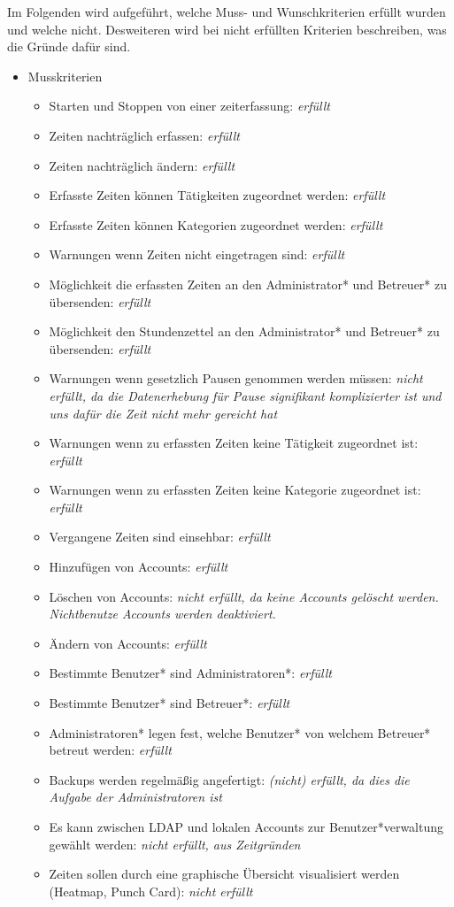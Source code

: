 Im Folgenden wird aufgeführt, welche Muss- und Wunschkriterien erfüllt wurden und welche nicht. Desweiteren wird bei nicht erfüllten Kriterien beschreiben, was die Gründe dafür sind.

\begin{itemize}
  \item Musskriterien
    \begin{itemize}
      \item Starten und Stoppen von einer zeiterfassung: \emph{erfüllt}
      \item Zeiten nachträglich erfassen: \emph{erfüllt} 
      \item Zeiten nachträglich ändern: \emph{erfüllt}
      \item Erfasste Zeiten können Tätigkeiten zugeordnet werden: \emph{erfüllt}
      \item Erfasste Zeiten können Kategorien zugeordnet werden: \emph{erfüllt}
      \item Warnungen wenn Zeiten nicht eingetragen sind: \emph{erfüllt}
      \item Möglichkeit die erfassten Zeiten an den Administrator* und Betreuer* zu übersenden: \emph{erfüllt}
	    \item Möglichkeit den Stundenzettel an den Administrator* und Betreuer* zu übersenden: \emph{erfüllt}
	    \item Warnungen wenn gesetzlich Pausen genommen werden müssen: \emph{nicht erfüllt, da die Datenerhebung für Pause signifikant komplizierter ist und uns dafür die Zeit nicht mehr gereicht hat}
	    \item Warnungen wenn zu erfassten Zeiten keine Tätigkeit zugeordnet ist: \emph{erfüllt}
	    \item Warnungen wenn zu erfassten Zeiten keine Kategorie zugeordnet ist: \emph{erfüllt}
	    \item Vergangene Zeiten sind einsehbar: \emph{erfüllt}
    	\item Hinzufügen von Accounts: \emph{erfüllt}
    	\item Löschen von Accounts: \emph{nicht erfüllt, da keine Accounts gelöscht werden. Nichtbenutze Accounts werden deaktiviert.}
    	\item Ändern von Accounts: \emph{erfüllt}
    	\item Bestimmte Benutzer* sind Administratoren*: \emph{erfüllt}
    	\item Bestimmte Benutzer* sind Betreuer*: \emph{erfüllt}
    	\item Administratoren* legen fest, welche Benutzer* von welchem Betreuer* betreut werden: \emph{erfüllt}
    	\item Backups werden regelmäßig angefertigt: \emph{(nicht) erfüllt, da dies die Aufgabe der Administratoren ist}
    	\item Es kann zwischen LDAP und lokalen Accounts zur Benutzer*verwaltung gewählt werden: \emph{nicht erfüllt, aus Zeitgründen}
    	\item Zeiten sollen durch eine graphische Übersicht visualisiert werden (Heatmap, Punch Card): \emph{nicht erfüllt}
    \end{itemize}
    

\end{itemize}
